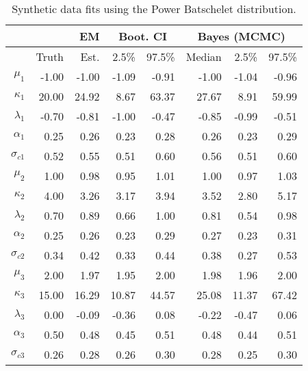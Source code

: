 \begin{table}[btp]
\centering
\caption{Synthetic data fits using the Power Batschelet distribution.} 
\label{tab:synth}
\begingroup\scriptsize
\begin{tabular}{rrrrrrrr}
  &&EM & \multicolumn{2}{c}{Boot. CI} & \multicolumn{3}{c}{Bayes (MCMC)} \\  \hline
 & Truth & Est. & 2.5\%  & 97.5\% & Median & 2.5\% & 97.5\% \\ 
  \hline
$\mu_1$ & -1.00 & -1.00 & -1.09 & -0.91 & -1.00 & -1.04 & -0.96 \\ 
  $\kappa_1$ & 20.00 & 24.92 & 8.67 & 63.37 & 27.67 & 8.91 & 59.99 \\ 
  $\lambda_1$ & -0.70 & -0.81 & -1.00 & -0.47 & -0.85 & -0.99 & -0.51 \\ 
  $\alpha_1$ & 0.25 & 0.26 & 0.23 & 0.28 & 0.26 & 0.23 & 0.29 \\ 
   \vspace{0.2cm} $\sigma_{c1}$ & 0.52 & 0.55 & 0.51 & 0.60 & 0.56 & 0.51 & 0.60 \\ 
  $\mu_2$ & 1.00 & 0.98 & 0.95 & 1.01 & 1.00 & 0.97 & 1.03 \\ 
  $\kappa_2$ & 4.00 & 3.26 & 3.17 & 3.94 & 3.52 & 2.80 & 5.17 \\ 
  $\lambda_2$ & 0.70 & 0.89 & 0.66 & 1.00 & 0.81 & 0.54 & 0.98 \\ 
  $\alpha_2$ & 0.25 & 0.26 & 0.23 & 0.29 & 0.27 & 0.23 & 0.31 \\ 
   \vspace{0.2cm} $\sigma_{c2}$ & 0.34 & 0.42 & 0.33 & 0.44 & 0.38 & 0.27 & 0.53 \\ 
  $\mu_3$ & 2.00 & 1.97 & 1.95 & 2.00 & 1.98 & 1.96 & 2.00 \\ 
  $\kappa_3$ & 15.00 & 16.29 & 10.87 & 44.57 & 25.08 & 11.37 & 67.42 \\ 
  $\lambda_3$ & 0.00 & -0.09 & -0.36 & 0.08 & -0.22 & -0.47 & 0.06 \\ 
  $\alpha_3$ & 0.50 & 0.48 & 0.45 & 0.51 & 0.48 & 0.44 & 0.51 \\ 
  $\sigma_{c3}$ & 0.26 & 0.28 & 0.26 & 0.30 & 0.28 & 0.25 & 0.30 \\ 
   \hline
\end{tabular}
\endgroup
\end{table}





